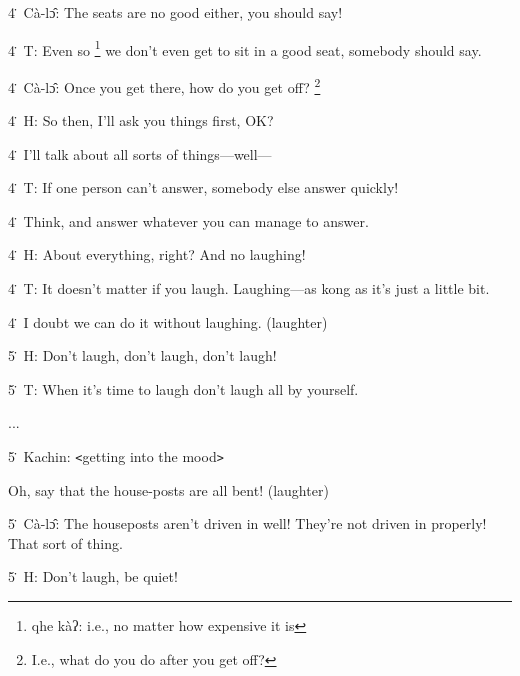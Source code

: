 4\. Cà-lɔ̂: The seats are no good either, you should say!

4\. T: Even so \footnote{qhe kàʔ: i.e., no matter how expensive it is} we don't even get to sit in a good seat, somebody should say.

4\. Cà-lɔ̂: Once you get there, how do you get off? \footnote{I.e., what do you do after you get off?}

4\. H: So then, I'll ask you things first, OK?

4\. I'll talk about all sorts of things---well---

4\. T: If one person can't answer, somebody else answer quickly!

4\. Think, and answer whatever you can manage to answer.

4\. H: About everything, right?  And no laughing!

4\. T: It doesn't matter if you laugh. Laughing---as kong as it's just a little
bit.

4\. I doubt we can do it without laughing. (laughter)

5\. H: Don't laugh, don't laugh, don't laugh!

5\. T: When it's time to laugh don't laugh all by yourself.

...

5\. Kachin: \texttt{<}getting into the mood\texttt{>}

Oh, say that the house-posts are all bent! (laughter)

5\. Cà-lɔ̂: The houseposts aren't driven in well!  They're not driven in properly!
That sort of thing.

5\. H: Don't laugh, be quiet!

